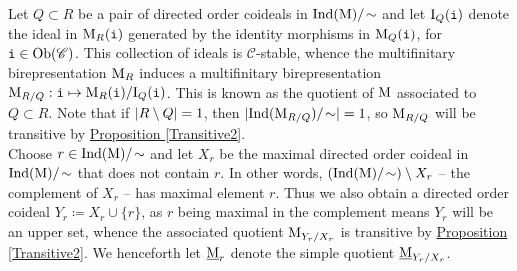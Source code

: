 \noindent Let $Q \subset R$ be a pair of directed order coideals in $\textup{Ind}(\textup{M})/\!\sim$ and let $\textup{I}_Q(\textnormal{\texttt{i}})$ denote the ideal in $\textup{M}_R(\textnormal{\texttt{i}})$ generated by the identity morphisms in $\textup{M}_Q(\textnormal{\texttt{i}})$, for $\textnormal{\texttt{i}} \in \textnormal{Ob}(\mathscr{C})$. This collection of ideals is $\mathscr{C}$-stable, whence the multifinitary birepresentation $\textup{M}_R$ induces a multifinitary birepresentation $\textup{M}_{R/Q} : \textnormal{\texttt{i}} \mapsto \textup{M}_R(\textnormal{\texttt{i}})/\textup{I}_Q(\textnormal{\texttt{i}})$. This is known as the quotient of $\textup{M}$ associated to $Q \subset R$. Note that if $\lvert R \setminus Q\rvert = 1$, then $\lvert\textup{Ind}(\textup{M}_{R/Q})/\!\sim\rvert = 1$, so $\textup{M}_{R/Q}$ will be transitive by \hyperref[Transitive2]{Proposition \ref*{Transitive2}}.\\

\noindent Choose $r \in \textup{Ind}(\textup{M})/\!\sim$ and let $X_r$ be the maximal directed order coideal in $\textup{Ind}(\textup{M})/\!\sim$ that does not contain $r$. In other words, $(\textup{Ind}(\textup{M})/\!\sim)\setminus X_r$ -- the complement of $X_r$ -- has maximal element $r$. %
Thus we also obtain a directed order coideal $Y_r \coloneqq X_r \cup \{r\}$, as $r$ being maximal in the complement means $Y_r$ will be an upper set, whence the associated quotient $\textup{M}_{Y_r/X_r}$ is transitive by \hyperref[Transitive2]{Proposition \ref*{Transitive2}}. We henceforth let $\underline{\textup{M}}_r$ denote the simple quotient $\underline{\textup{M}}_{Y_r/X_r}$.\newpage


